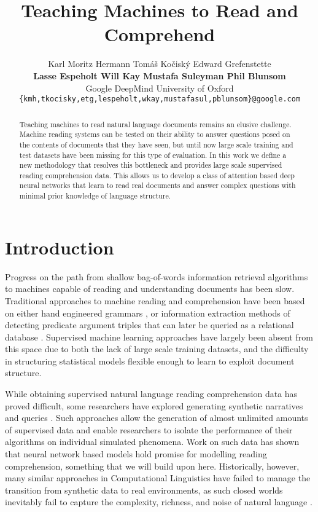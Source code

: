 \documentclass{article}
\title{Teaching Machines to Read and Comprehend}
\author{
  Karl Moritz Hermann \quad Tom\'a\v{s} Ko\v{c}isk\'y \quad Edward Grefenstette \\
  {\bf Lasse Espeholt \quad Will Kay \quad Mustafa Suleyman
  \quad Phil Blunsom} \\
Google DeepMind \quad
University of Oxford \\
\texttt{\{kmh,tkocisky,etg,lespeholt,wkay,mustafasul,pblunsom\}@google.com} \\
}
\begin{document}
\maketitle

\begin{abstract}
  Teaching machines to read natural language documents remains an elusive
  challenge. Machine reading systems can be tested on their ability to answer
  questions posed on the contents of documents that they have seen, but
  until now large scale training and test datasets have been missing for this
  type of evaluation.
  In this work we define a new methodology that resolves this bottleneck
  and provides large scale supervised reading comprehension data.
  This allows us to develop a class of attention based
  deep neural networks that learn to read real documents
  and answer complex questions with minimal prior knowledge of language
  structure.
\end{abstract}

\section{Introduction}
\label{introduction}

Progress on the path from shallow bag-of-words information retrieval
algorithms to machines capable of reading and understanding documents has been
slow. Traditional approaches to machine reading and comprehension have been
based on either hand engineered grammars \cite{Riloff:2000:RQA}, or information
extraction methods of detecting predicate argument triples that can later be
queried as a relational database \cite{Poon:2010:MRU}.
Supervised machine learning approaches have largely been absent from this space
due to both the lack of large scale training datasets, and the difficulty in
structuring statistical models flexible enough to learn to exploit document
structure.

While obtaining supervised natural language reading comprehension data has
proved difficult, some researchers have explored generating synthetic narratives
and queries \cite{Weston:2014:MN,Sukhbaatar:2015}. Such approaches allow
the generation of almost unlimited amounts of supervised data and enable
researchers to isolate the performance of their algorithms on individual
simulated phenomena. Work on such data has shown that neural network based
models hold promise for modelling reading comprehension, something that we
will build upon here.  Historically, however, many similar approaches in
Computational Linguistics have failed to manage the transition from synthetic
data to real environments, as such closed worlds inevitably fail to
capture the complexity, richness, and noise of natural language
\cite{Winograd:1972:UNL}.
\end{document}
